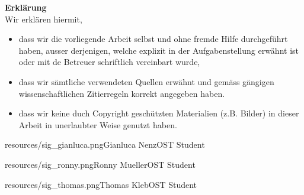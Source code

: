 \vspace{2 cm}

\noindent \textbf{Erklärung} \\
Wir erklären hiermit, \\

\begin{itemize}
    \item dass wir die vorliegende Arbeit selbst und ohne fremde Hilfe durchgeführt haben, ausser derjenigen, welche explizit in der Aufgabenstellung erwähnt ist oder mit de Betreuer schriftlich vereinbart wurde,
    \item dass wir sämtliche verwendeten Quellen erwähnt und gemäss gängigen wissen\-schaftlichen Zitierregeln korrekt angegeben haben.
    \item dass wir keine duch Copyright geschützten Materialien (z.B. Bilder) in dieser Arbeit in unerlaubter Weise genutzt haben.
\end{itemize}

\signature{0.6}{resources/sig_gianluca.png}{Gianluca Nenz}{OST Student}\hfill\signature{2}{resources/sig_ronny.png}{Ronny Mueller}{OST Student}

\signature{0.2}{resources/sig_thomas.png}{Thomas Kleb}{OST Student}

